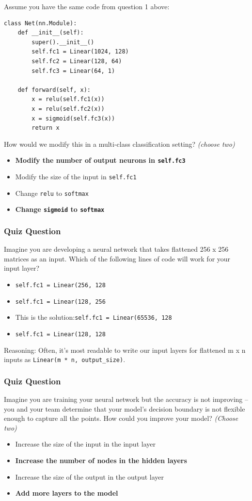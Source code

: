 Assume you have the same code from question 1 above:
\begin{lstlisting}
class Net(nn.Module):
    def __init__(self):
        super().__init__()
        self.fc1 = Linear(1024, 128)
        self.fc2 = Linear(128, 64)
        self.fc3 = Linear(64, 1)

    def forward(self, x):
        x = relu(self.fc1(x))
        x = relu(self.fc2(x))
        x = sigmoid(self.fc3(x))
        return x
\end{lstlisting}
How would we modify this in a multi-class classification setting? \textit{(choose two)}
\begin{itemize}
    \item \textbf{Modify the number of output neurons in \lstinline{self.fc3}}
    \item Modify the size of the input in \lstinline{self.fc1}
    \item Change \lstinline{relu} to \lstinline{softmax}
    \item \textbf{Change \lstinline{sigmoid} to \lstinline{softmax}}
\end{itemize}


\subsubsection{Quiz Question}

Imagine you are developing a neural network that takes flattened 256 x 256 matrices as an input. Which of the following lines of code will work for your input layer?
\begin{itemize}
    \item \lstinline{self.fc1 = Linear(256, 128}
    \item \lstinline{self.fc1 = Linear(128, 256}
    \item This is the solution:\lstinline{self.fc1 = Linear(65536, 128}
    \item \lstinline{self.fc1 = Linear(128, 128}
\end{itemize}
Reasoning: Often, it's most readable to write our input layers for flattened m x n inputs as \verb|Linear(m * n, output_size)|.

\subsubsection{Quiz Question}

Imagine you are training your neural network but the accuracy is not improving -- you and your team determine that your model's decision boundary is not flexible enough to capture all the points. How could you improve your model? \textit{(Choose two)}
\begin{itemize}
    \item Increase the size of the input in the input layer
    \item \textbf{Increase the number of nodes in the hidden layers}
    \item Increase the size of  the output in the output layer
    \item \textbf{Add more layers to the model}
\end{itemize}

